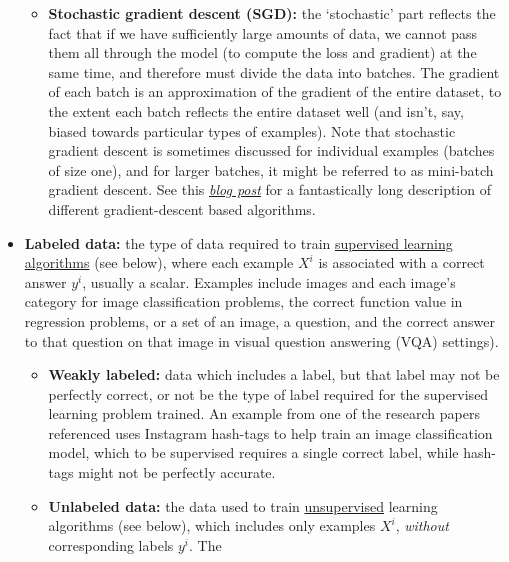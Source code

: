 \begin{itemize}
  \begin{itemize}
  \item \textbf{Stochastic gradient descent (SGD):\label{tg:sgd}} the `stochastic' part reflects the fact that if we have sufficiently large amounts of data, we cannot pass them all through the model (to compute the loss and gradient) at the same time, and therefore must divide the data into batches. The gradient of each batch is an approximation of the gradient of the entire dataset, to the extent each batch reflects the entire dataset well (and isn't, say, biased towards particular types of examples). Note that stochastic gradient descent is sometimes discussed for individual examples (batches of size one), and for larger batches, it might be referred to as mini-batch gradient descent. See this \href{http://ruder.io/optimizing-gradient-descent/index.html\#stochasticgradientdescent}{\emph{blog post}} for a fantastically long description of different gradient-descent based algorithms.
  
  \end{itemize}
\item \textbf{Labeled data:\label{tg:labeled-data}} the type of data required to train \hyperref[tg:supervised]{supervised learning algorithms} (see below), where each example $X^i$ is associated with a correct answer $y^i$, usually a scalar. Examples include images and each image's category for image classification problems, the correct function value in regression problems, or a set of an image, a question, and the correct answer to that question on that image in visual question answering (VQA) settings).

  \begin{itemize}
  \item \textbf{Weakly labeled:\label{tg:weakly-labeled}} data which includes a label, but that label may not be perfectly correct, or not be the type of label required for the supervised learning problem trained. An example from one of the research papers referenced \parencite{Mahajan2018} uses Instagram hash-tags to help train an image classification model, which to be supervised requires a single correct label, while hash-tags might not be perfectly accurate.
  
  \item \textbf{Unlabeled data:\label{tg:unlabeled}} the data used to train \hyperref[tg:unsupervised]{unsupervised} learning algorithms (see below), which includes only examples $X^i$, \emph{without} corresponding labels $y^i$. The
  

\end{itemize}
\end{itemize}
